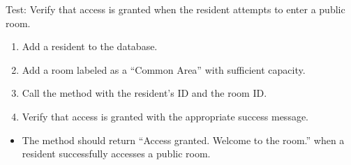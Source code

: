 \documentclass[letterpaper,10pt,english]{sphinxmanual}
\begin{document}
\begin{fulllineitems}
\label{\detokenize{test:test.test_room.test_access_room_public_room}}
\pysigstartsignatures
\pysiglinewithargsret
{}
{}
{}
\pysigstopsignatures
\sphinxAtStartPar
Test: Verify that access is granted when the resident attempts to enter a public room.
\begin{description}
\begin{enumerate}
%
\item {} 
\sphinxAtStartPar
Add a resident to the database.

\item {} 
\sphinxAtStartPar
Add a room labeled as a “Common Area” with sufficient capacity.

\item {} 
\sphinxAtStartPar
Call the  method with the resident’s ID and the room ID.

\item {} 
\sphinxAtStartPar
Verify that access is granted with the appropriate success message.

\end{enumerate}

\begin{itemize}
\item {} 
\sphinxAtStartPar
The method should return “Access granted. Welcome to the room.”
when a resident successfully accesses a public room.

\end{itemize}

\end{description}

\end{fulllineitems}

\end{document}
